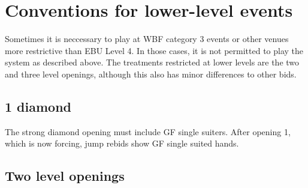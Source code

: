 \documentclass[a4paper,14pt]{extarticle}
\begin{document}
\newpage

\section{Conventions for lower-level events}
\label{sec:cat3}

Sometimes it is neccessary to play at WBF category 3 events or other venues
more restrictive than EBU Level 4. In those cases, it is not permitted to play
the system as described above. The treatments restricted at lower levels are
the two and three level openings, although this also has minor differences to
other bids.

\subsection{1 diamond}

The strong diamond opening must include GF single suiters. After opening
1\diamonds, which is now forcing, jump rebids show GF single suited hands.

\subsection{Two level openings}
\end{document}

